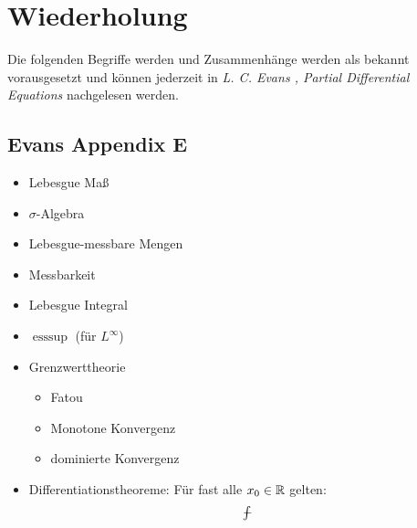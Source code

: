 \chapter*{Wiederholung}
Die folgenden Begriffe werden und Zusammenhänge werden als bekannt
vorausgesetzt und können jederzeit in \textit{L. C. Evans , Partial
Differential Equations} nachgelesen werden.
\enter
\section{Evans Appendix E}
\begin{itemize}
	\item Lebesgue Maß
\item $\sigma$-Algebra
\item Lebesgue-messbare Mengen
\item Messbarkeit
\item Lebesgue Integral
\item $\text{ess}\sup$ (für $L^\infty$)
\item Grenzwerttheorie
\begin{itemize}
\item Fatou
\item Monotone Konvergenz
\item dominierte Konvergenz
\end{itemize}
\item Differentiationstheoreme:\enter
Für fast alle $x_0 \in \mathbb{R}$ gelten:
\[\avint\]
\end{itemize}
